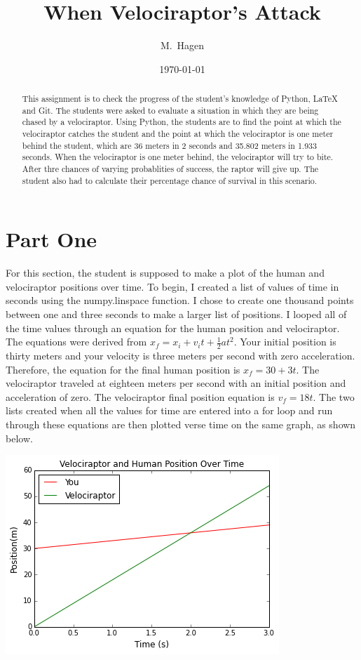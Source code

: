\documentclass[twocolumn]{revtex4}
\begin{document}
\title{
When Velociraptor's Attack
}

\author{M.~Hagen}

\date{\today}

\begin{abstract}
    This assignment is to check the progress of the student's knowledge of Python, LaTeX and Git. The students were asked to evaluate a situation in which they are being chased by a velociraptor. Using Python, the students are to find the point at which the velociraptor catches the student and the point at which the velociraptor is one meter behind the student, which are 36 meters in 2 seconds and 35.802 meters in 1.933 seconds. When the velociraptor is one meter behind, the velociraptor will try to bite. After thre chances of varying probablities of success, the raptor will give up. The student also had to calculate their percentage chance of survival in this scenario.
\end{abstract}

\maketitle
\section{Part One}
	For this section, the student is supposed to make a plot of the human and velociraptor positions over time. To begin, I created a list of values of time in seconds using the numpy.linspace function. I chose to create one thousand points between one and three seconds to make a larger list of positions. I looped all of the time values through an equation for the human position and velociraptor. The equations were derived from $x_f = x_i + v_it + \frac{1}{2}at^2$. Your initial position is thirty meters and your velocity is three meters per second with zero acceleration. Therefore, the equation for the final human position is $x_f = 30 + 3t$. The velociraptor traveled at eighteen meters per second with an initial position and acceleration of zero. The velociraptor final position equation is $v_f = 18t$. The two lists created when all the values for time are entered into a for loop and run through these equations are then plotted verse time on the same graph, as shown below.  

\includegraphics[scale=.6]{graph1.png}
\end{document}

